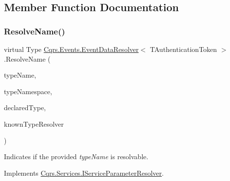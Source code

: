 \subsection{Member Function Documentation}
\mbox{\label{classCqrs_1_1Events_1_1EventDataResolver_ade34415acd009dd3f9f3a43169da43e9_ade34415acd009dd3f9f3a43169da43e9}} 
\subsubsection{\texorpdfstring{Resolve\+Name()}{ResolveName()}}
{\footnotesize\ttfamily virtual Type \hyperlink{classCqrs_1_1Events_1_1EventDataResolver}{Cqrs.\+Events.\+Event\+Data\+Resolver}$<$ T\+Authentication\+Token $>$.Resolve\+Name (\begin{DoxyParamCaption}\item[{string}]{type\+Name,  }\item[{string}]{type\+Namespace,  }\item[{Type}]{declared\+Type,  }\item[{Data\+Contract\+Resolver}]{known\+Type\+Resolver }\end{DoxyParamCaption})\hspace{0.3cm}{\ttfamily [virtual]}}



Indicates if the provided {\itshape type\+Name}  is resolvable. 



Implements \hyperlink{interfaceCqrs_1_1Services_1_1IServiceParameterResolver_a37c4b53616192e4e2f15ab4661ab99ae_a37c4b53616192e4e2f15ab4661ab99ae}{Cqrs.\+Services.\+I\+Service\+Parameter\+Resolver}.

\mbox{\label{classCqrs_1_1Events_1_1EventDataResolver_a62be7cd15bb38f3a4054a62e787c473d_a62be7cd15bb38f3a4054a62e787c473d}} 
